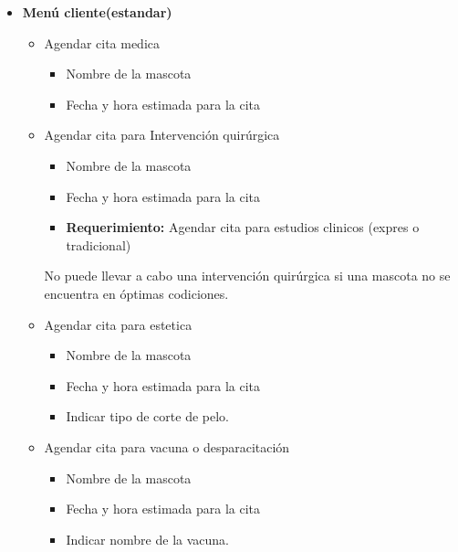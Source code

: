 \documentclass{bachw}
\begin{document}
\begin{itemize}
    \item \textbf{Menú cliente(estandar)}
    \begin{itemize}
        \item Agendar cita medica 
        \begin{itemize}
            \item Nombre de la mascota
            \item Fecha y hora estimada para la cita
        \end{itemize}
        \item Agendar cita para Intervención quirúrgica
        \begin{itemize}
            \item Nombre de la mascota
            \item Fecha y hora estimada para la cita
            \item \textbf{Requerimiento:} Agendar cita para estudios clinicos (expres o tradicional)
        \end{itemize}
        No puede llevar a cabo una intervención quirúrgica si una mascota no se encuentra en óptimas codiciones.
        \item Agendar cita para estetica
        \begin{itemize}
            \item Nombre de la mascota
            \item Fecha y hora estimada para la cita
            \item Indicar tipo de corte de pelo.
        \end{itemize}
        \item Agendar cita para vacuna o desparacitación
        \begin{itemize}
            \item Nombre de la mascota
            \item Fecha y hora estimada para la cita
            \item Indicar nombre de la vacuna.
        \end{itemize}


\end{itemize}
\end{itemize}
\end{document}

